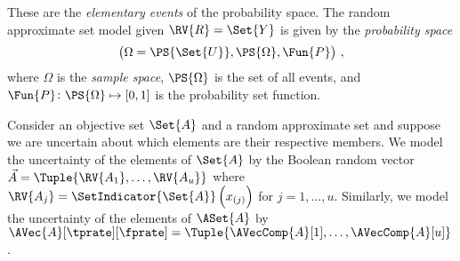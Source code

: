 \documentclass[ ../main.tex]{subfiles}
\begin{document}
These are the \emph{elementary events} of the probability space.
The random approximate set model given $\RV{R} = \Set{Y}$ is given by the \emph{probability space}
\begin{equation}
\left(\Omega = \PS{\Set{U}}, \PS{\Omega}, \Fun{P}\right)\,,
\end{equation}
where $\Omega$ is the \emph{sample space}, $\PS{\Omega}$ is the set of all events, and $\Fun{P} \colon \PS{\Omega} \mapsto [0,1]$ is the probability set function.




Consider an objective set $\Set{A}$ and a random approximate set  and suppose we are uncertain about which elements are their respective members.
We model the uncertainty of the elements of $\Set{A}$ by the Boolean random vector $\vec{A} = \Tuple{\RV{A_1},\ldots,\RV{A_u}}$ where $\RV{A_j} = \SetIndicator{\Set{A}}\left(x_{(j)}\right)$ for $j=1,\ldots,u$.
Similarly, we model the uncertainty of the elements of $\ASet{A}$ by $\AVec{A}[\tprate][\fprate] = \Tuple{\AVecComp{A}[1],\ldots,\AVecComp{A}[u]}$.
\end{document}
